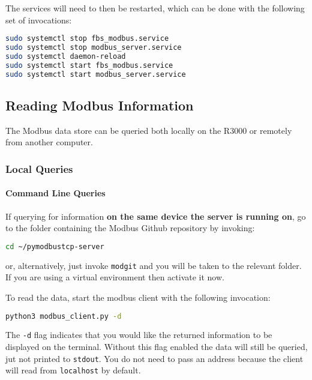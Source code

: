 \documentclass[10pt,]{article}
\newcommand{\passthrough}[1]{#1}
\begin{document}
The services will need to then be restarted, which can be done with the
following set of invocations:

\begin{lstlisting}[language=bash]
sudo systemctl stop fbs_modbus.service
sudo systemctl stop modbus_server.service
sudo systemctl daemon-reload
sudo systemctl start fbs_modbus.service
sudo systemctl start modbus_server.service
\end{lstlisting}

\hypertarget{reading-modbus-information}{%
\subsection{Reading Modbus
Information}\label{reading-modbus-information}}

The Modbus data store can be queried both locally on the R3000 or
remotely from another computer.

\hypertarget{local-queries}{%
\subsubsection{Local Queries}\label{local-queries}}

\hypertarget{command-line-queries}{%
\paragraph{Command Line Queries}\label{command-line-queries}}

If querying for information \textbf{on the same device the server is
running on}, go to the folder containing the Modbus Github repository by
invoking:

\begin{lstlisting}[language=bash]
cd ~/pymodbustcp-server
\end{lstlisting}

or, alternatively, just invoke \passthrough{\lstinline!modgit!} and you
will be taken to the relevant folder. If you are using a virtual
environment then activate it now.

To read the data, start the modbus client with the following invocation:

\begin{lstlisting}[language=bash]
python3 modbus_client.py -d
\end{lstlisting}

The \passthrough{\lstinline!-d!} flag indicates that you would like the
returned information to be displayed on the terminal. Without this flag
enabled the data will still be queried, jut not printed to
\passthrough{\lstinline!stdout!}. You do not need to pass an address
because the client will read from \passthrough{\lstinline!localhost!} by
default.
\end{document}
